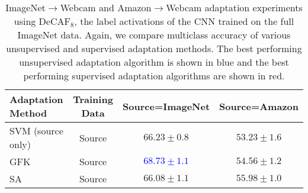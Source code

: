 \begin{table*}
\centering
\begin{tabular}{lccc}
\toprule
Adaptation Method & Training Data & Source=ImageNet & Source=Amazon \\
\midrule
SVM (source only) & Source & $66.23 \pm 0.8$ & $53.23 \pm 1.6$ \\
\midrule
GFK \cite{gong-cvpr12} & Source & \textcolor{blue}{$\bm{68.73 \pm 1.1}$} & $54.56 \pm 1.2$ \\
SA \cite{sa} & Source & $66.08 \pm 1.1$ & $55.98 \pm 1.0$ \\
\bottomrule
\end{tabular}
\caption{ImageNet$\rightarrow$Webcam and Amazon$\rightarrow$Webcam adaptation
  experiments using DeCAF$_8$, the label activations of the CNN trained on the
  full ImageNet data. Again, we compare multiclass accuracy of various
  unsupervised and supervised adaptation methods. The best performing
  unsupervised adaptation algorithm is shown in blue and the best performing
  supervised adaptation algorithms are shown in red.}
\label{tab:fc8}
\end{table*}
